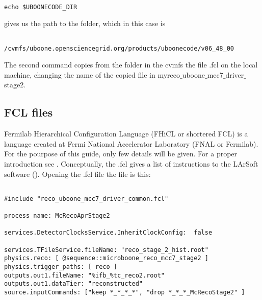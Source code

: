 \begin{verbatim}

echo $UBOONECODE_DIR

\end{verbatim}

gives us the path to the folder, which in this case is

\begin{verbatim}

/cvmfs/uboone.opensciencegrid.org/products/uboonecode/v06_48_00

\end{verbatim}

The second command copies from the folder in the cvmfs the file .fcl on the local machine, changing the name of the copied file in myreco${\_}$uboone${\_}$mcc7${\_}$driver${\_}$stage2. 



	\subsection{FCL files}  \label{sssec:fcl_xml}

Fermilab Hierarchical Configuration Language (FHiCL or shortered FCL) is a language created at Fermi National Accelerator Laboratory (FNAL or Fermilab). For the pourpose of this guide, only few details will be given. For a proper introduction see \cite{fcl_guide}. Conceptually, the .fcl gives a list of instructions to the LArSoft software (\cite{larsoft}). Opening the .fcl file the file is this:

\begin{verbatim}

#include "reco_uboone_mcc7_driver_common.fcl"

process_name: McRecoAprStage2

services.DetectorClocksService.InheritClockConfig:  false

services.TFileService.fileName: "reco_stage_2_hist.root"
physics.reco: [ @sequence::microboone_reco_mcc7_stage2 ]
physics.trigger_paths: [ reco ]
outputs.out1.fileName: "%ifb_%tc_reco2.root"
outputs.out1.dataTier: "reconstructed"
source.inputCommands: ["keep *_*_*_*", "drop *_*_*_McRecoStage2" ]

\end{verbatim}

